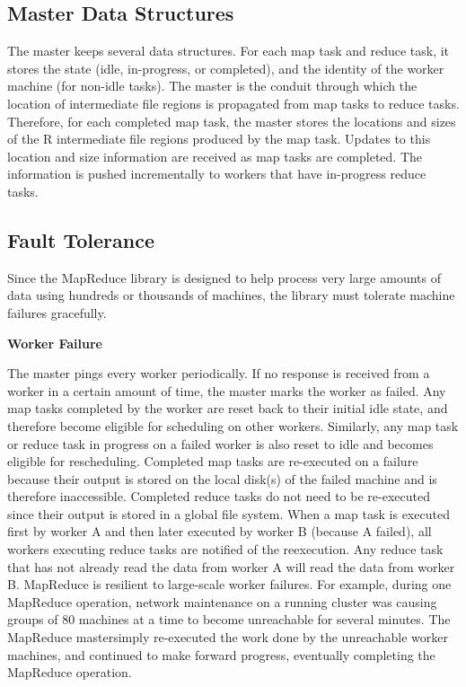 \subsection {Master Data Structures}

The master keeps several data structures. For each map
task and reduce task, it stores the state (idle, in-progress,
or completed), and the identity of the worker machine
(for non-idle tasks).
The master is the conduit through which the location
of intermediate file regions is propagated from map tasks
to reduce tasks. Therefore, for each completed map task,
the master stores the locations and sizes of the R intermediate
file regions produced by the map task. Updates
to this location and size information are received as map
tasks are completed. The information is pushed incrementally
to workers that have in-progress reduce tasks.


\subsection{Fault Tolerance}
Since the MapReduce library is designed to help process
very large amounts of data using hundreds or thousands
of machines, the library must tolerate machine failures
gracefully.

\vspace*{8pt}%
\textbf{Worker Failure}
\vspace*{8pt}%


The master pings every worker periodically. If no response is received from a worker in a certain amount of time, the master marks the worker as failed. Any map tasks completed by the worker are reset back to their initial
idle state, and therefore become eligible for scheduling
on other workers. Similarly, any map task or reduce
task in progress on a failed worker is also reset to idle
and becomes eligible for rescheduling.
Completed map tasks are re-executed on a failure because
their output is stored on the local disk(s) of the
failed machine and is therefore inaccessible. Completed
reduce tasks do not need to be re-executed since their
output is stored in a global file system.
When a map task is executed first by worker A and
then later executed by worker B (because A failed), all
workers executing reduce tasks are notified of the reexecution.
Any reduce task that has not already read the
data from worker A will read the data from worker B.
MapReduce is resilient to large-scale worker failures.
For example, during one MapReduce operation, network
maintenance on a running cluster was causing groups of
80 machines at a time to become unreachable for several
minutes. The MapReduce mastersimply re-executed
the work done by the unreachable worker machines, and
continued to make forward progress, eventually completing
the MapReduce operation.

